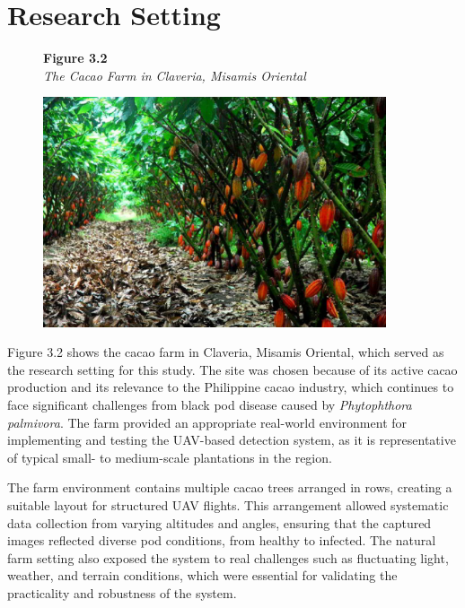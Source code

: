 \section{Research Setting}

\begin{figure}[H]
	\raggedright
	\textbf{Figure 3.2} \\ %
	\textit{The Cacao Farm in Claveria, Misamis Oriental} %

	\vspace{0.5em}
	\centering
	\includegraphics[width=0.9\textwidth]{figures/Cacao_Farm.pdf} %

	\vspace{0.5em}
	\raggedright

	\label{fig:cacao_farm}
\end{figure}

Figure 3.2 shows the cacao farm in Claveria, Misamis Oriental, which served as the research setting for this study.
The site was chosen because of its active cacao production and its relevance to the Philippine cacao industry, which continues to face significant challenges from black pod disease caused by \textit{Phytophthora palmivora}.
The farm provided an appropriate real-world environment for implementing and testing the UAV-based detection system, as it is representative of typical small- to medium-scale plantations in the region.

The farm environment contains multiple cacao trees arranged in rows, creating a suitable layout for structured UAV flights.
This arrangement allowed systematic data collection from varying altitudes and angles, ensuring that the captured images reflected diverse pod conditions, from healthy to infected.
The natural farm setting also exposed the system to real challenges such as fluctuating light, weather, and terrain conditions, which were essential for validating the practicality and robustness of the system.


